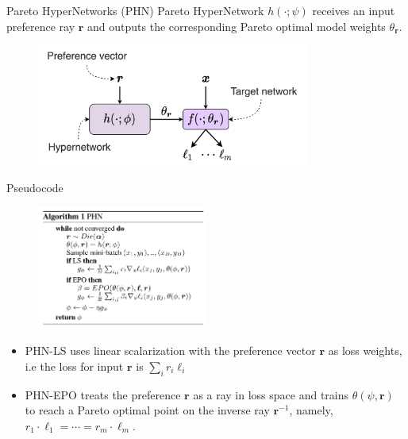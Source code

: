 \documentclass[13pt]{beamer}				\usepackage{graphicx}
\begin{document}
\begin{frame}{Pareto HyperNetworks (PHN)}
Pareto HyperNetwork $h(\cdot; \psi)$ receives an input preference ray $\mathbf{r}$ and outputs the corresponding Pareto optimal model weights $\theta_{\mathbf{r}}$. 
\begin{figure}[h!]
    \includegraphics[width=0.8\textwidth, trim={0 0 0 0cm},clip]{images/phn.png}
\end{figure}
\end{frame}

\begin{frame}{Pseudocode} 
\begin{figure}[h!]
    \includegraphics[width=0.5\textwidth, trim={0 0 0 0cm},clip]{images/phn_algo.png}
\end{figure}
\begin{itemize}
\item PHN-LS uses linear scalarization with the preference vector $\textbf{r}$ as loss weights, i.e the loss for input $\textbf{r}$ is $\sum_i r_i \ell_i$
\item PHN-EPO treats the preference $\textbf{r}$ as a ray in loss space and trains $\theta(\psi, \textbf{r})$ to reach a Pareto optimal point on the inverse ray $\textbf{r}^{-1}$, namely, $r_1 \cdot \ell_1 = \cdots = r_m \cdot \ell_m$.
\end{itemize}
\end{frame}
\end{document}
